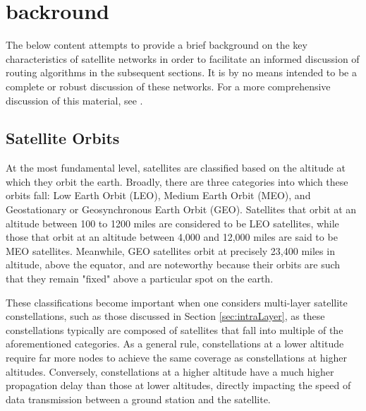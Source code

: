 
\section{backround}\label{sec:background}
The below content attempts to provide a brief background on the key characteristics of satellite networks in order to facilitate an informed discussion of routing algorithms in the subsequent sections. It is by no means intended to be a complete or robust discussion of these networks. For a more comprehensive discussion of this material, see \cite{elbert_introduction_2008}.

\subsection{Satellite Orbits}\label{subsec:satelliteOrbits}
At the most fundamental level, satellites are classified based on the altitude at which they orbit the earth. Broadly, there are three categories into which these orbits fall: Low Earth Orbit (LEO), Medium Earth Orbit (MEO), and Geostationary or Geosynchronous Earth Orbit (GEO)\cite{stone_introduction_2004}. Satellites that orbit at an altitude between 100 to 1200 miles are considered to be LEO satellites, while those that orbit at an altitude between 4,000 and 12,000 miles are said to be MEO satellites\cite{stone_introduction_2004}. Meanwhile, GEO satellites orbit at precisely 23,400 miles in altitude, above the equator, and are noteworthy because their orbits are such that they remain "fixed" above a particular spot on the earth\cite{stone_introduction_2004}. 

These classifications become important when one considers multi-layer satellite constellations, such as those discussed in Section \ref{sec:intraLayer}, as these constellations typically are composed of satellites that fall into multiple of the aforementioned categories. As a general rule, constellations at a lower altitude require far more nodes to achieve the same coverage as constellations at higher altitudes\cite{elbert_introduction_2008}. Conversely, constellations at a higher altitude have a much higher propagation delay than those at lower altitudes, directly impacting the speed of data transmission between a ground station and the satellite\cite{elbert_introduction_2008}.

